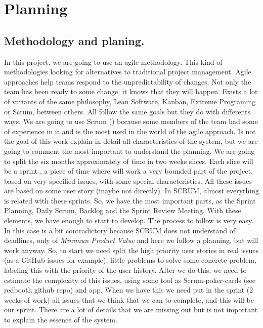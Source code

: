 \chapter{Planning}
\section{Methodology and planing.}

In this project, we are going to use an agile methodology.
This kind of methodologies looking for alternatives to traditional project management.
Agile approaches help teams respond to the unpredictability of changes.
Not only the team has been ready to some change, it knows that they will happen.
\intro
Exists a lot of variants of the same philosophy, Lean Software, Kanban,
Extreme Programing or Scrum, between others.
All follow the same goals but they do with differents ways.
\intro
We are going to use Scrum (\cite{scrumbook}) because some members of the team had some of experience
in it and is the most used in the world of the agile approach.
Is not the goal of this work explain in detail all characteristics of the system,
but we are going to comment the most important to understand the planning.
\intro
We are going to split the six months approximately of time in two weeks slices.
Each slice will be a sprint , a piece of time where will work a very bounded part
of the project, based on very specified issues, with some special characteristics.
All these issues are based on some user story (maybe not directly).
\intro
In SCRUM, almost everything is related with these sprints. So, we have the most
important parts, as the Sprint Planning, Daily Scrum, Backlog and the Sprint
Review Meeting. With these elements, we have enough to start to develop.
The process to follow is very easy. In this case is a bit contradictory because
SCRUM does not understand of deadlines, only of \textit{Minimun Product Value}
and here we follow a planning, but will work anyway.
\intro
So, to start we need split the high priority user stories in real issues (as a
GitHub issues for example), little problems to solve some concrete problem,
labeling this with the priority of the user history.
After we do this, we need to estimate the complexity of this issues, using some
tool as Scrum-poker-cards (see redbooth github repo) and app.  When we have this
we need put in the sprint (2 weeks of work) all issues that we think that we can
to complete, and this will be our sprint.
\intro
There are a lot of details that we are missing out but is not important to explain
the essence of the system.
